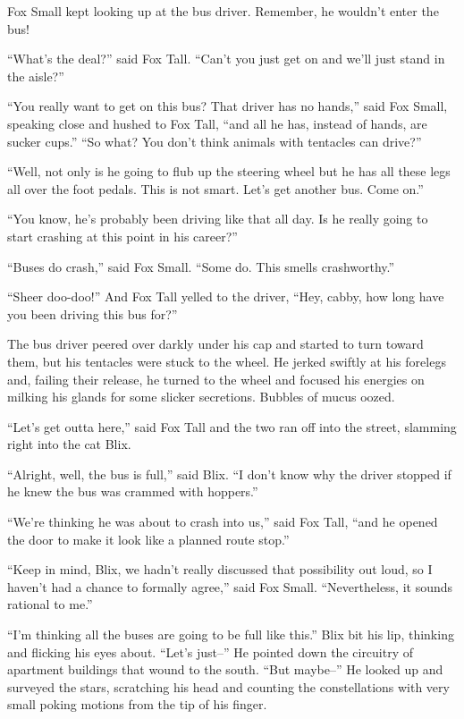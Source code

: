 \documentclass[10pt,twoside]{report}
\begin{document}
Fox Small kept looking up at the bus driver.  Remember, he wouldn't
enter the bus!

``What's the deal?'' said Fox Tall.  ``Can't you just get on and we'll
just stand in the aisle?''

``You really want to get on this bus?  That driver has no hands,''
said Fox Small, speaking close and hushed to Fox Tall, ``and all he
has, instead of hands, are sucker cups.''  ``So what?  You don't think
animals with tentacles can drive?''

``Well, not only is he going to flub up the steering wheel but he has
all these legs all over the foot pedals.  This is not smart.  Let's
get another bus.  Come on.''

``You know, he's probably been driving like that all day.  Is he
really going to start crashing at this point in his career?''

``Buses do crash,'' said Fox Small.  ``Some do.  This smells
crashworthy.''

``Sheer doo-doo!''  And Fox Tall yelled to the driver, ``Hey, cabby,
how long have you been driving this bus for?''

The bus driver peered over darkly under his cap and started to turn
toward them, but his tentacles were stuck to the wheel.  He jerked
swiftly at his forelegs and, failing their release, he turned to the
wheel and focused his energies on milking his glands for some slicker
secretions.  Bubbles of mucus oozed.

``Let's get outta here,'' said Fox Tall and the two ran off into the
street, slamming right into the cat Blix.

``Alright, well, the bus is full,'' said Blix.  ``I don't know why the
driver stopped if he knew the bus was crammed with hoppers.''

``We're thinking he was about to crash into us,'' said Fox Tall, ``and
he opened the door to make it look like a planned route stop.''

``Keep in mind, Blix, we hadn't really discussed that possibility out
loud, so I haven't had a chance to formally agree,'' said Fox Small.
``Nevertheless, it sounds rational to me.''

``I'm thinking all the buses are going to be full like this.''  Blix
bit his lip, thinking and flicking his eyes about.  ``Let's just--''
He pointed down the circuitry of apartment buildings that wound to the
south.  ``But maybe--'' He looked up and surveyed the stars,
scratching his head and counting the constellations with very small
poking motions from the tip of his finger.
\end{document}
